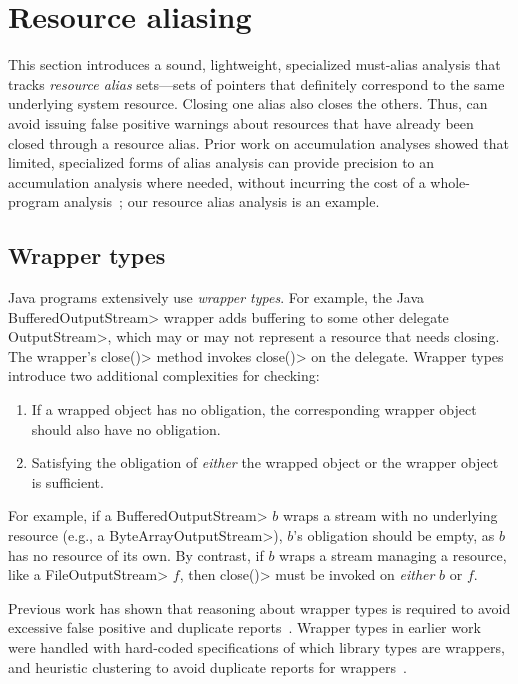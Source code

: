 \section{Resource aliasing}
\label{sec:must-call-choice}

This section introduces a sound, lightweight, specialized must-alias analysis
that tracks \emph{resource alias} sets---sets of pointers that
definitely correspond to the same underlying system resource.  Closing
one alias also closes the others.  Thus,
\tool can avoid issuing false positive warnings about resources
that have already been closed through a resource alias.  Prior
work on accumulation analyses showed that limited, specialized forms
of alias analysis can provide precision to an accumulation analysis
where needed, without incurring the cost of a whole-program
analysis~\cite{KelloggRSSE2020}; our resource alias analysis is an
example.

\subsection{Wrapper types}

Java programs extensively use \emph{wrapper types}.  For example, the Java
\<BufferedOutputStream> wrapper adds buffering to some other delegate \<OutputStream>, which
may or may not represent a resource that needs closing.  The wrapper's 
\<close()> method invokes \<close()> on the delegate.
Wrapper types
introduce two additional complexities for \MustCall checking:
\begin{enumerate}
  \item If a wrapped object has no \MustCall obligation, the corresponding
  wrapper object should also have no obligation.
  \item Satisfying the obligation of \emph{either} the wrapped object or the
  wrapper object is sufficient.
\end{enumerate}
For example, if a \<BufferedOutputStream> $b$ wraps a stream with no underlying
resource (e.g., a \<ByteArrayOutputStream>), $b$'s
\MustCall obligation should be empty,
as $b$ has no resource of its own.  By contrast,
if $b$ wraps a stream managing a resource, like a \<File\-Out\-put\-Stream> $f$,
then \<close()> must be invoked on \emph{either} $b$ or $f$.

Previous work has shown that reasoning about wrapper types is
required to avoid excessive false positive and duplicate
reports~\cite{TorlakC10,ecj-resource-leak}.  Wrapper types in earlier
work were handled with hard-coded specifications of which library
types are wrappers, and heuristic clustering to avoid duplicate reports for
wrappers~\cite{TorlakC10}.

